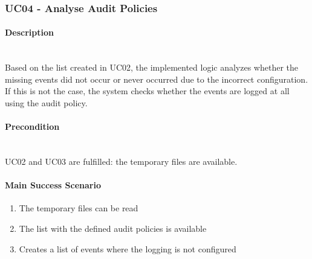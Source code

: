 \subsubsection{UC04 - Analyse Audit Policies}
\begin{tcolorbox}
    \paragraph{Description} \ \\
    Based on the list created in UC02, the implemented logic analyzes whether the missing events did not occur or never occurred due to the incorrect configuration. If this is not the case, the system checks whether the events are logged at all using the audit policy.
    \ \\
    \paragraph{Precondition} \ \\
    UC02 and UC03 are fulfilled: the temporary files are available.
    \ \\
    \paragraph{Main Success Scenario} 
    \begin{enumerate}
        \item The temporary files can be read
        \item The list with the defined audit policies is available
        \item Creates a list of events where the logging is not configured
    \end{enumerate}   
\end{tcolorbox}

